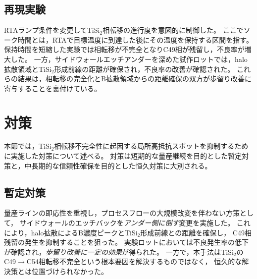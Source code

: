 \documentclass[conference]{IEEEtran}
\begin{document}
\subsection{再現実験}
RTAランプ条件を変更してTiSi$_2$相転移の進行度を意図的に制御した。  
ここでソーク時間とは，RTAで目標温度に到達した後にその温度を保持する区間を指す。  
保持時間を短縮した実験では相転移が不完全となりC49相が残留し，不良率が増大した。  
一方，サイドウォールエッチアンダーを深めた試作ロットでは，halo拡散領域とTiSi$_2$形成前線の距離が確保され，不良率の改善が確認された。  
これらの結果は，相転移の完全化とB拡散領域からの距離確保の双方が歩留り改善に寄与することを裏付けている。

\section{対策}
本節では，TiSi$_2$相転移不完全性に起因する局所高抵抗スポットを抑制するために実施した対策について述べる。  
対策は短期的な量産継続を目的とした暫定対策と，中長期的な信頼性確保を目的とした恒久対策に大別される。

\subsection{暫定対策}
量産ラインの即応性を重視し，プロセスフローの大規模改変を伴わない方策として，
サイドウォールのエッチバックを\emph{アンダー側に倒す}変更を実施した。  
これにより，halo拡散によるB濃度ピークとTiSi$_2$形成前線との距離を確保し，
C49相残留の発生を抑制することを狙った。  
実験ロットにおいては不良発生率の低下が確認され，\emph{歩留り改善に一定の効果}が得られた。  
一方で，本手法はTiSi$_2$のC49$\to$C54相転移不完全という根本要因を解決するものではなく，
恒久的な解決策とは位置づけられなかった。
\end{document}
